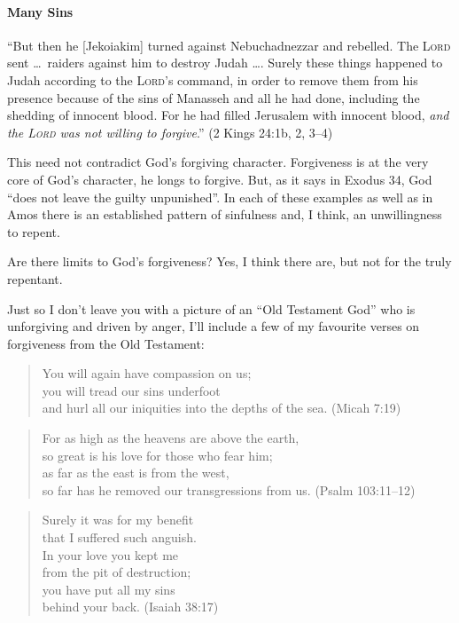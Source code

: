 \paragraph{Many Sins}\enquote{But then he [Jekoiakim] turned against
Nebuchadnezzar and rebelled. The \textsc{Lord} sent \dots\ raiders against him
to destroy Judah \dots. Surely these things happened to Judah according to the
\textsc{Lord}'s command, in order to remove them from his presence because of
the sins of Manasseh and all he had done, including the shedding of innocent
blood. For he had filled Jerusalem with innocent blood, \emph{and the
\textsc{Lord} was not willing to forgive}.} (2 Kings 24:1b, 2, 3--4)

This need not contradict God's forgiving character. Forgiveness is at the very
core of God's character, he longs to forgive. But, as it says in Exodus 34, God
\enquote{does not leave the guilty unpunished}. In each of these examples as
well as in Amos there is an established pattern of sinfulness and, I think, an
unwillingness to repent.

Are there limits to God's forgiveness? Yes, I think there are, but not for the
truly repentant.

Just so I don't leave you with a picture of an \enquote{Old Testament God} who
is unforgiving and driven by anger, I'll include a few of my favourite verses on
forgiveness from the Old Testament:

\begin{quote}
    You will again have compassion on us;\\
    \VerseIndent you will tread our sins underfoot\\
    \VerseIndent and hurl all our iniquities into the depths of the sea. (Micah
    7:19)\\
\end{quote}

\begin{quote}
    For as high as the heavens are above the earth,\\
    \VerseIndent so great is his love for those who fear him;\\
    as far as the east is from the west,\\
    \VerseIndent so far has he removed our transgressions from us. (Psalm 103:11--12)\\
\end{quote}

\VerseQuoteStyle
\begin{quote}
    Surely it was for my benefit\\
    \VerseIndent that I suffered such anguish.\\
    In your love you kept me\\
    \VerseIndent from the pit of destruction;\\
    you have put all my sins\\
    \VerseIndent behind your back. (Isaiah 38:17)\\
\end{quote}


